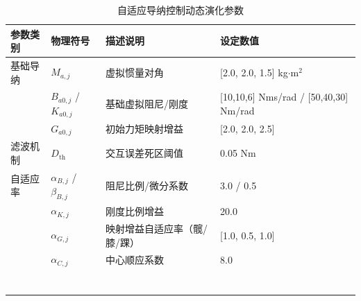\begin{table}[htbp]
\centering
\caption{自适应导纳控制动态演化参数}
\begin{tabular}{lllp{4cm}}
\toprule
参数类别 & 物理符号 & 描述说明 & 设定数值 \\
\midrule
基础导纳 & $M_{a,j}$ & 虚拟惯量对角 & [2.0, 2.0, 1.5] kg$\cdot$m$^2$ \\
 & $B_{a0,j}$ / $K_{a0,j}$ & 基础虚拟阻尼/刚度 & [10,10,6] Nms/rad / [50,40,30] Nm/rad \\
 & $G_{a0,j}$ & 初始力矩映射增益 & [2.0, 2.0, 2.5] \\
滤波机制 & $D_{\mathrm{th}}$ & 交互误差死区阈值 & 0.05 Nm \\
自适应率 & $\alpha_{B,j}$ / $\beta_{B,j}$ & 阻尼比例/微分系数 & 3.0 / 0.5 \\
 & $\alpha_{K,j}$ & 刚度比例增益 & 20.0 \\
 & $\alpha_{G,j}$ & 映射增益自适应率（髋/膝/踝） & [1.0, 0.5, 1.0] \\
 & $\alpha_{C,j}$ & 中心顺应系数 & 8.0 \\
 &  &  &  \\
 &  &  &  \\
 &  &  &  \\
 &  &  &  \\
 &  &  &  \\
 &  &  &  \\
 &  &  &  \\
\bottomrule
\end{tabular}
\end{table}
